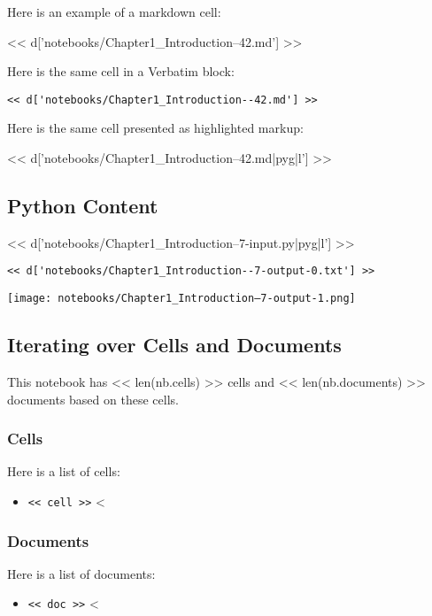 \documentclass[12pt]{article}
\begin{document}
Here is an example of a markdown cell:

<< d['notebooks/Chapter1_Introduction--42.md'] >>

Here is the same cell in a Verbatim block:

\begin{Verbatim}
<< d['notebooks/Chapter1_Introduction--42.md'] >>
\end{Verbatim}

Here is the same cell presented as highlighted markup:

<< d['notebooks/Chapter1_Introduction--42.md|pyg|l'] >>

\subsection*{Python Content}

<< d['notebooks/Chapter1_Introduction--7-input.py|pyg|l'] >>

\begin{Verbatim}
<< d['notebooks/Chapter1_Introduction--7-output-0.txt'] >>
\end{Verbatim}

\texttt{[image: notebooks/Chapter1\_Introduction--7-output-1.png]}

\subsection*{Iterating over Cells and Documents}

This notebook has << len(nb.cells) >> cells and << len(nb.documents) >> documents based on these cells.

\subsubsection*{Cells}

Here is a list of cells:

\begin{itemize}
<%
\item{\verb|<< cell >>|}
<%
\end{itemize}

\subsubsection*{Documents}

Here is a list of documents:

\begin{itemize}
<%
\item{\verb|<< doc >>|}
<%
\end{itemize}
\end{document}
